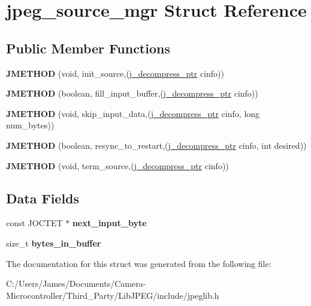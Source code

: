 \hypertarget{structjpeg__source__mgr}{}\section{jpeg\+\_\+source\+\_\+mgr Struct Reference}
\label{structjpeg__source__mgr}
\subsection*{Public Member Functions}
\begin{DoxyCompactItemize}
\item 
\mbox{\label{structjpeg__source__mgr_a8669737c5b8541ebb249400e989d28fa}} 
{\bfseries J\+M\+E\+T\+H\+OD} (void, init\+\_\+source,(\hyperlink{structjpeg__decompress__struct}{j\+\_\+decompress\+\_\+ptr} cinfo))
\item 
\mbox{\label{structjpeg__source__mgr_a85bdf9bd94047d571d44948f0c8f3d53}} 
{\bfseries J\+M\+E\+T\+H\+OD} (boolean, fill\+\_\+input\+\_\+buffer,(\hyperlink{structjpeg__decompress__struct}{j\+\_\+decompress\+\_\+ptr} cinfo))
\item 
\mbox{\label{structjpeg__source__mgr_aaed59b5f81631ca95daa806a165b1948}} 
{\bfseries J\+M\+E\+T\+H\+OD} (void, skip\+\_\+input\+\_\+data,(\hyperlink{structjpeg__decompress__struct}{j\+\_\+decompress\+\_\+ptr} cinfo, long num\+\_\+bytes))
\item 
\mbox{\label{structjpeg__source__mgr_a1e9afa4420c7ebd2f26589a9dc1d5e5a}} 
{\bfseries J\+M\+E\+T\+H\+OD} (boolean, resync\+\_\+to\+\_\+restart,(\hyperlink{structjpeg__decompress__struct}{j\+\_\+decompress\+\_\+ptr} cinfo, int desired))
\item 
\mbox{\label{structjpeg__source__mgr_a41f1f0dd187303ec8f045550f7080f51}} 
{\bfseries J\+M\+E\+T\+H\+OD} (void, term\+\_\+source,(\hyperlink{structjpeg__decompress__struct}{j\+\_\+decompress\+\_\+ptr} cinfo))
\end{DoxyCompactItemize}
\subsection*{Data Fields}
\begin{DoxyCompactItemize}
\item 
\mbox{\label{structjpeg__source__mgr_aa78a812bda3e8a22f7e8d1df83014883}} 
const J\+O\+C\+T\+ET $\ast$ {\bfseries next\+\_\+input\+\_\+byte}
\item 
\mbox{\label{structjpeg__source__mgr_a4c2fa4f6d7fbd202e084c45bde590a41}} 
size\+\_\+t {\bfseries bytes\+\_\+in\+\_\+buffer}
\end{DoxyCompactItemize}


The documentation for this struct was generated from the following file\+:\begin{DoxyCompactItemize}
\item 
C\+:/\+Users/\+James/\+Documents/\+Camera-\/\+Microcontroller/\+Third\+\_\+\+Party/\+Lib\+J\+P\+E\+G/include/jpeglib.\+h\end{DoxyCompactItemize}
